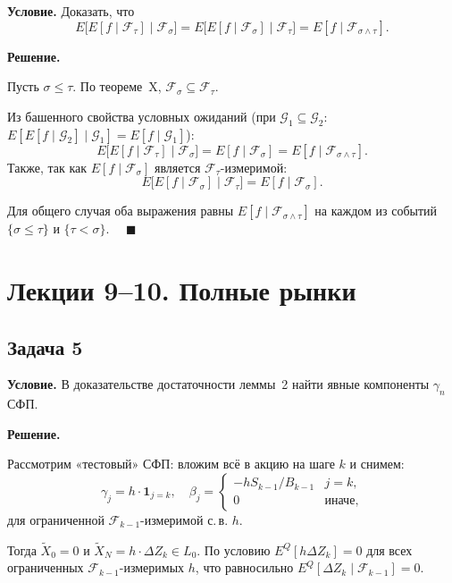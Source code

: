 \documentclass[12pt,a4paper]{article}
\theoremstyle{zadacha}
\begin{document}
\textbf{Условие.} Доказать, что
\[
E\bigl[E[f \mid \mathcal{F}_\tau] \mid \mathcal{F}_\sigma\bigr] = E\bigl[E[f \mid \mathcal{F}_\sigma] \mid \mathcal{F}_\tau\bigr] = E[f \mid \mathcal{F}_{\sigma \wedge \tau}].
\]

\medskip
\textbf{Решение.}

Пусть $\sigma \leq \tau$. По теореме~X, $\mathcal{F}_\sigma \subseteq \mathcal{F}_\tau$.

Из башенного свойства условных ожиданий (при $\mathcal{G}_1 \subseteq \mathcal{G}_2$: $E[E[f \mid \mathcal{G}_2] \mid \mathcal{G}_1] = E[f \mid \mathcal{G}_1]$):
\[
E\bigl[E[f \mid \mathcal{F}_\tau] \mid \mathcal{F}_\sigma\bigr] = E[f \mid \mathcal{F}_\sigma] = E[f \mid \mathcal{F}_{\sigma \wedge \tau}].
\]
Также, так как $E[f \mid \mathcal{F}_\sigma]$ является $\mathcal{F}_\tau$-измеримой:
\[
E\bigl[E[f \mid \mathcal{F}_\sigma] \mid \mathcal{F}_\tau\bigr] = E[f \mid \mathcal{F}_\sigma].
\]

Для общего случая оба выражения равны $E[f \mid \mathcal{F}_{\sigma \wedge \tau}]$ на каждом из событий $\{\sigma \leq \tau\}$ и $\{\tau < \sigma\}$. $\quad\blacksquare$

\section{Лекции 9–10. Полные рынки}

\subsection*{Задача 5}

\textbf{Условие.} В доказательстве достаточности леммы~2 найти явные компоненты $\gamma_n$ СФП.

\medskip
\textbf{Решение.}

Рассмотрим «тестовый» СФП: вложим всё в акцию на шаге $k$ и снимем:
\[
\gamma_j = h \cdot \mathbf{1}_{j = k}, \quad
\beta_j = \begin{cases} -h S_{k-1}/B_{k-1} & j = k, \\ 0 & \text{иначе,} \end{cases}
\]
для ограниченной $\mathcal{F}_{k-1}$-измеримой с.\,в. $h$.

Тогда $\tilde{X}_0 = 0$ и $\tilde{X}_N = h \cdot \Delta Z_k \in L_0$. По условию $E^Q[h \Delta Z_k] = 0$
для всех ограниченных $\mathcal{F}_{k-1}$-измеримых $h$, что равносильно $E^Q[\Delta Z_k \mid \mathcal{F}_{k-1}] = 0$.
\end{document}
